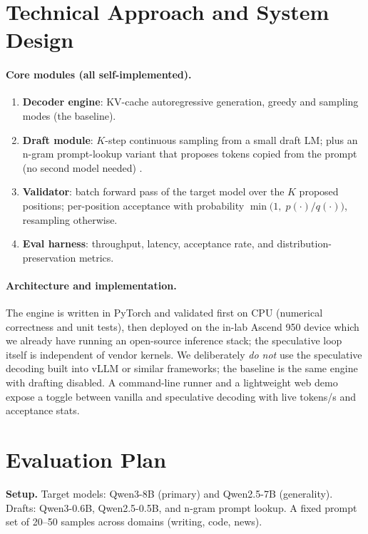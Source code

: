 \documentclass[11pt]{article}
\begin{document}
\section{Technical Approach and System Design}
\paragraph{Core modules (all self-implemented).}
\begin{enumerate}[label=\arabic*.]
\item \textbf{Decoder engine}: KV-cache autoregressive generation, greedy and
      sampling modes (the baseline).
\item \textbf{Draft module}: $K$-step continuous sampling from a small draft LM;
      plus an n-gram prompt-lookup variant that proposes tokens copied from the
      prompt (no second model needed) \citep{nvidia2023promptlookup}.
\item \textbf{Validator}: batch forward pass of the target model over the $K$
      proposed positions; per-position acceptance with probability
      $\min\!\bigl(1,\; p(\cdot)/q(\cdot)\bigr)$, resampling otherwise.
\item \textbf{Eval harness}: throughput, latency, acceptance rate, and
      distribution-preservation metrics.
\end{enumerate}

\paragraph{Architecture and implementation.}
The engine is written in PyTorch and validated first on CPU (numerical correctness
and unit tests), then deployed on the in-lab Ascend 950 device which we already
have running an open-source inference stack; the speculative loop itself is
independent of vendor kernels. We deliberately \emph{do not} use the speculative
decoding built into vLLM or similar frameworks; the baseline is the same engine
with drafting disabled. A command-line runner and a lightweight web demo expose a
toggle between vanilla and speculative decoding with live tokens/s and acceptance
stats.

\section{Evaluation Plan}
\textbf{Setup.} Target models: Qwen3-8B (primary) and Qwen2.5-7B (generality).
Drafts: Qwen3-0.6B, Qwen2.5-0.5B, and n-gram prompt lookup. A fixed prompt set of
20--50 samples across domains (writing, code, news).
\end{document}
